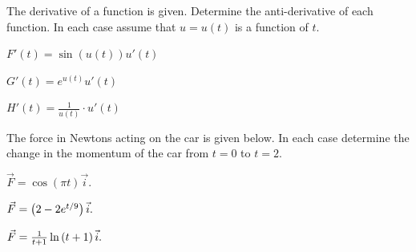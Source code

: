 \begin{problem}
  \clearpage

\item The derivative of a function is given. Determine the
  anti-derivative of each function. In each case assume that $u=u(t)$
  is a function of $t$. 
  \begin{subproblem}
  \item $F'(t) = \sin(u(t)) u'(t)$
    \vfill
  \item $G'(t) = e^{u(t)} u'(t)$
    \vfill
  \item $H'(t) = \frac{1}{u(t)} \cdot u'(t)$
    \vfill
  \end{subproblem}

  \clearpage

\item The force in Newtons acting on the car is given below. In each
  case determine the change in the momentum of the car from $t=0$ to
  $t=2$. 
  \begin{subproblem}
    \item $\vec{F} = \cos(\pi t) \vec{i}.$
      \vfill
    \item $\vec{F} = \left( 2 - 2 e^{t/9} \right) \vec{i}.$
      \vfill
    \item $\vec{F} = \frac{1}{t+1} \ln\left( t+1 \right) \vec{i}.$
      \vfill
  \end{subproblem}

\end{problem}

\postClass

